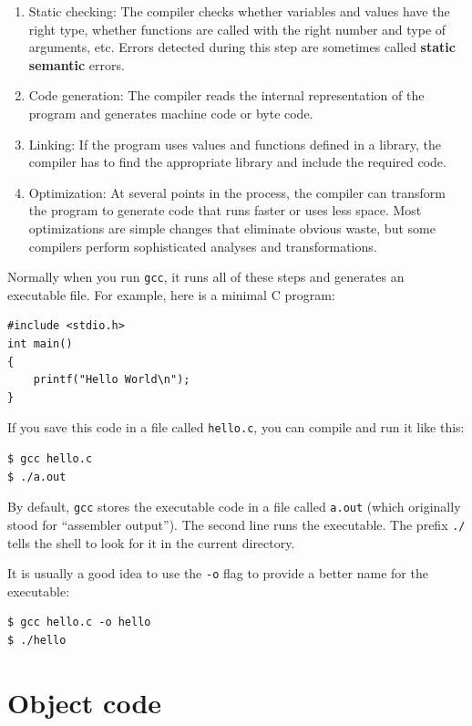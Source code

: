 \documentclass[12pt]{book}
\begin{document}
{\begin{enumerate}
\item Static checking: The compiler checks whether variables and
  values have the right type, whether functions are called with the
  right number and type of arguments, etc.  Errors detected during
  this step are sometimes called {\bf static semantic} errors.

\item Code generation: The compiler reads the internal representation
  of the program and generates machine code or byte code.

\item Linking: If the program uses values and functions defined in a
  library, the compiler has to find the appropriate library and
  include the required code.

\item Optimization: At several points in the process, the compiler
  can transform the program to generate code that runs faster or
  uses less space.  Most optimizations are simple changes that eliminate
  obvious waste, but some compilers perform sophisticated analyses and
  transformations.

\end{enumerate}

Normally when you run {\tt gcc}, it runs all of these steps and
generates an executable file.  For example, here is a minimal C
program:

\begin{verbatim}
#include <stdio.h>
int main()
{
    printf("Hello World\n");
}
\end{verbatim}

If you save this code in a file called
{\tt hello.c}, you can compile and run it like this:

\begin{verbatim}
$ gcc hello.c
$ ./a.out
\end{verbatim}

By default, {\tt gcc} stores the executable code in a file
called {\tt a.out} (which originally stood for ``assembler output'').
The second line runs the executable.  The prefix \verb"./" tells
the shell to look for it in the current directory.

It is usually a good idea to use the {\tt -o} flag to provide a
better name for the executable:

\begin{verbatim}
$ gcc hello.c -o hello
$ ./hello
\end{verbatim}


\section{Object code}

}
\end{document}

